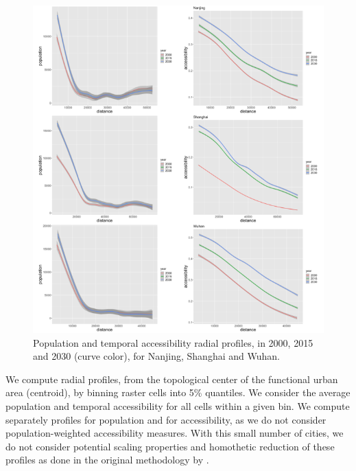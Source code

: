 \documentclass{article}
\begin{document}
\begin{figure}
	\includegraphics[width=\linewidth]{Fig2b.png}
	\caption{Population and temporal accessibility radial profiles, in 2000, 2015 and 2030 (curve color), for Nanjing, Shanghai and Wuhan.\label{fig:fig4}}
\end{figure}

We compute radial profiles, from the topological center of the functional urban area (centroid), by binning raster cells into 5\% quantiles. We consider the average population and temporal accessibility for all cells within a given bin. We compute separately profiles for population and for accessibility, as we do not consider population-weighted accessibility measures. With this small number of cities, we do not consider potential scaling properties and homothetic reduction of these profiles as done in the original methodology by \cite{lemoy2020evidence}.
\end{document}
